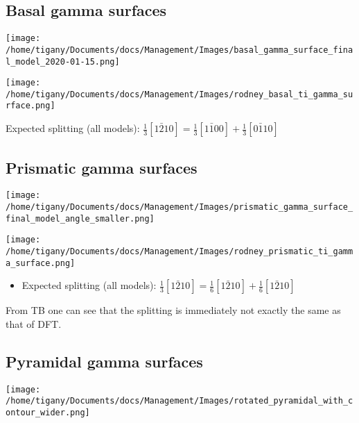 \documentclass[11pt]{article}
\begin{document}
\subsection*{Basal gamma surfaces}
\label{sec:org9d93995}


\begin{center}
\texttt{[image: /home/tigany/Documents/docs/Management/Images/basal\_gamma\_surface\_final\_model\_2020-01-15.png]}
\label{org4c4d208}
\end{center}


\begin{center}
\texttt{[image: /home/tigany/Documents/docs/Management/Images/rodney\_basal\_ti\_gamma\_surface.png]}
\end{center}

Expected splitting (all models): \(\frac{1}{3}[1\bar{2}10] = \frac{1}{3}[1\bar{1}00] +  \frac{1}{3}[0\bar{1}10]\)

\subsection*{Prismatic gamma surfaces}
\label{sec:orge5f9d77}

\begin{center}
\texttt{[image: /home/tigany/Documents/docs/Management/Images/prismatic\_gamma\_surface\_final\_model\_angle\_smaller.png]}
\end{center}


\begin{center}
\texttt{[image: /home/tigany/Documents/docs/Management/Images/rodney\_prismatic\_ti\_gamma\_surface.png]}
\end{center}


\begin{itemize}
\item Expected splitting (all models): \(\frac{1}{3}[1\bar{2}10] = \frac{1}{6}[1\bar{2}10] + \frac{1}{6}[1\bar{2}10]\)
\end{itemize}

\begin{NOTES}


From TB one can see that the splitting is immediately not exactly the same as
that of DFT. 
\end{NOTES}

\subsection*{Pyramidal gamma surfaces}
\label{sec:org2690df2}
\begin{center}
\texttt{[image: /home/tigany/Documents/docs/Management/Images/rotated\_pyramidal\_with\_contour\_wider.png]}
\label{org30cc862}
\end{center}
\end{document}
